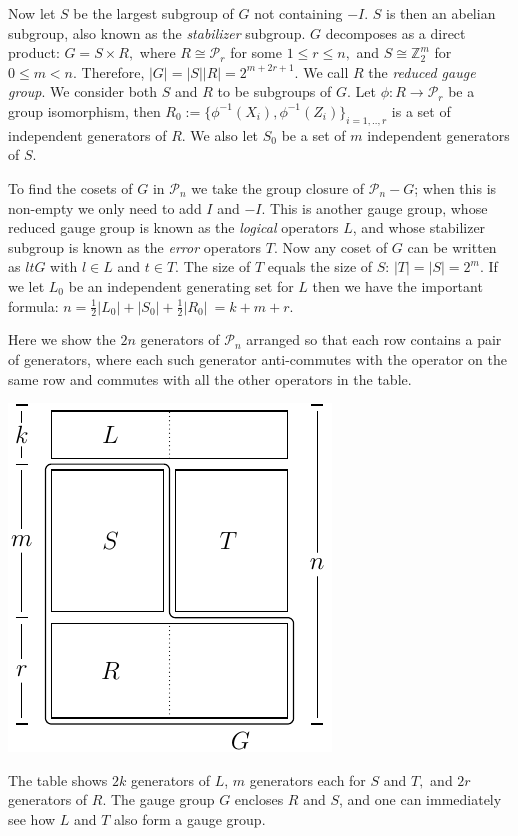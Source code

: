 \documentclass[11pt,oneside]{article}
\def\Z{\mathbb{Z}}
\def\Pauli{\mathcal{P}}
\def\Stab{S}
\begin{document}
Now let $\Stab$ be the largest subgroup of $G$ not containing $-I.$
$\Stab$ is then an abelian subgroup,
also known as the {\it stabilizer} subgroup.
$G$ decomposes as a direct product:
$G = \Stab\times R,$
where $R\cong \Pauli_r$ for some $1\le r\le n,$
and $\Stab\cong \Z_2^{m}$ for $0\le m<n.$
Therefore, 
$|G| = |\Stab| |R| = 2^{m+2r+1}.$
We call $R$ the {\it reduced gauge group}.
We consider both $\Stab$ and $R$ to be subgroups of $G.$
Let $\phi:R\to \Pauli_r$ be a group isomorphism,
then $R_0 := \{\phi^{-1}(X_i), \phi^{-1}(Z_i)\}_{i=1,..,r}$
is a set of independent generators of $R.$
We also let $\Stab_0$ be a set of $m$ independent generators of $\Stab.$

To find the cosets of $G$ in $\Pauli_n$ we take
the group closure of $\Pauli_n-G$; when this is non-empty
we only need to add $I$ and $-I.$
This is another
gauge group, whose reduced gauge group is known as
the {\it logical} operators $L$, and whose 
stabilizer subgroup is known as the {\it error} operators $T.$
Now any coset of $G$ can be written as $ltG$ with
$l\in L$ and $t\in T.$
The size of $T$ equals the size of $\Stab$: $|T|=|\Stab|=2^m.$
If we let $L_0$ be an independent generating set for $L$
then we have the important formula:
$
n = \frac{1}{2}|L_0| + |\Stab_0| + \frac{1}{2}|R_0|\
  = k + m + r.
$

Here we show the $2n$ generators of $\Pauli_n$ arranged 
so that each row contains a pair of generators,
where each such generator anti-commutes with the operator on the same row and
commutes with all the other operators in the table.
\begin{center}
\includegraphics[]{pic-canonical.pdf}
\end{center}
The table shows $2k$ generators
of $L$, $m$ generators each for $S$ and $T,$ and $2r$
generators of $R.$
The gauge group $G$ encloses $R$ and $S$, and one can
immediately see how $L$ and $T$ also form a gauge group.
\end{document}
